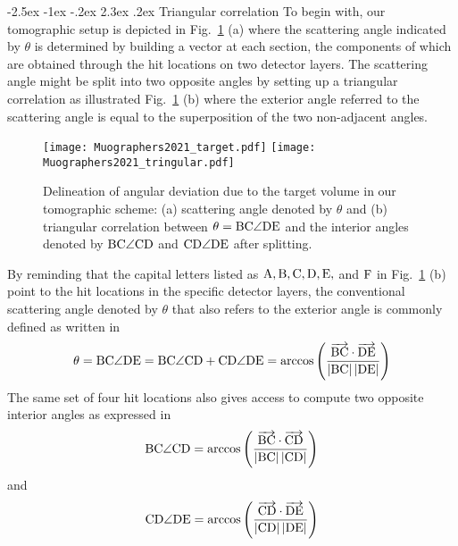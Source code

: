 \documentclass[10.75pt]{article}
\makeatletter
\renewcommand\section{\@startsection{section}{1}{\z@}%
   {-2.5ex \@plus -1ex \@minus -.2ex}%
   {2.3ex \@plus.2ex}%
   {\normalfont\large\bfseries}}
\makeatother
\begin{document}
\section{Triangular correlation}
To begin with, our tomographic setup is depicted in Fig.~\ref{angular} (a) where the scattering angle indicated by $\theta$ is determined by building a vector at each section, the components of which are obtained through the hit locations on two detector layers. The scattering angle might be split into two opposite angles by setting up a triangular correlation as illustrated Fig.~\ref{angular} (b) where the exterior angle referred to the scattering angle is equal to the superposition of the two non-adjacent angles.
\label{triangular correlation}
\begin{figure}[H]
\begin{center}
\texttt{[image: Muographers2021\_target.pdf]}
\hskip 1cm
\texttt{[image: Muographers2021\_tringular.pdf]}
\caption{Delineation of angular deviation due to the target volume in our tomographic scheme: (a) scattering angle denoted by $\theta$ and (b) triangular correlation between $\theta=\rm BC\angle DE$ and the interior angles denoted by $\rm BC\angle CD$ and $\rm CD\angle DE$ after splitting.}
\label{angular}
\end{center}
\end{figure}
\vskip -0.25cm
By reminding that the capital letters listed as $\rm A, B, C, D, E,$ and $\rm F$ in Fig.~\ref{angular} (b) point to the hit locations in the specific detector layers, the conventional scattering angle denoted by $\theta$ that also refers to the exterior angle is commonly defined as written in~\cite{carlisle2012multiple, nugent2017multiple, poulson2019application}
\begin{equation}
\theta=\rm BC\angle DE=\rm BC\angle CD + \rm CD\angle DE=\arccos\left(\frac{\overrightarrow{\rm BC}\cdot\overrightarrow{\rm DE}}{\left|BC\right|\left|DE\right|}\right)
\label{superpose}
\end{equation}
The same set of four hit locations also gives access to compute two opposite interior angles as expressed in 
\begin{equation}
\rm BC\angle CD=\arccos\left(\frac{\overrightarrow{\rm  BC}\cdot\overrightarrow{\rm  CD}}{\left|BC\right|\left|CD\right|}\right)
\end{equation}
and
\begin{equation}
\rm CD\angle DE=\arccos\left(\frac{\overrightarrow{\rm  CD}\cdot\overrightarrow{\rm  DE}}{\left|CD\right|\left|DE\right|}\right)
\end{equation}
\end{document}
